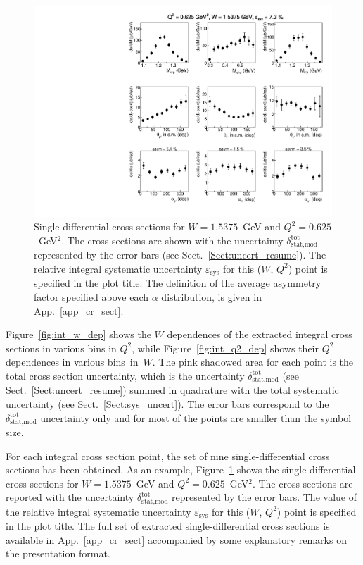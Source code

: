 \begin{figure}[htp]
\begin{center}
\includegraphics[width=\textwidth]{pictures/conclusion/w_15375.pdf}
\caption{\small Single-differential cross sections for $W= 1.5375$~GeV and $Q^{2}= 0.625$~GeV$^{2}$. The cross sections are shown with the uncertainty $\delta_{\text{stat,mod}}^{\text{tot}}$ represented by the error bars (see Sect.~\ref{Sect:uncert_resume}). The relative integral systematic uncertainty $\varepsilon_{\text{sys}}$ for this ($W$, $Q^{2}$) point is specified in the plot title. The definition of the average asymmetry factor specified above each $\alpha$ distribution, is given in App.~\ref{app_cr_sect}. }\label{fig:diff_plots}
\end{center}
\end{figure}



Figure~\ref{fig:int_w_dep} shows the $W$ dependences of the extracted integral cross sections in various bins in $Q^{2}$, while Figure~\ref{fig:int_q2_dep} shows their $Q^{2}$ dependences in various bins~in~$W$. The pink shadowed area for each point is the total cross section uncertainty, which is the uncertainty $\delta_{\text{stat,mod}}^{\text{tot}}$ (see Sect.~\ref{Sect:uncert_resume}) summed in quadrature with the total systematic uncertainty (see Sect.~\ref{Sect:sys_uncert}). The error bars correspond to the $\delta_{\text{stat,mod}}^{\text{tot}}$ uncertainty only and for most of the points are smaller than the symbol size.

For each integral cross section point, the set of nine single-differential cross sections has been obtained. As an example, Figure~\ref{fig:diff_plots} shows the single-differential cross sections for $W= 1.5375$~GeV and $Q^{2}= 0.625$~GeV$^{2}$. The cross sections are reported with the uncertainty $\delta_{\text{stat,mod}}^{\text{tot}}$ represented by the error bars. The value of the relative integral systematic uncertainty $\varepsilon_{\text{sys}}$ for this ($W$, $Q^{2}$) point is specified in the plot title. The full set of extracted single-differential cross sections is available in App.~\ref{app_cr_sect} accompanied by some explanatory remarks on the presentation format.


